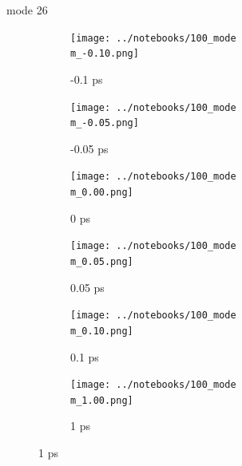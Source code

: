 \documentclass{beamer}
\newcommand\w{0.32}
\begin{document}
\renewcommand\m{26}
\begin{frame}{mode \m}
	\begin{figure}
		\centering
		\begin{subfigure}[b]{\w\textwidth}
			\centering
			\texttt{[image: ../notebooks/100\_mode\\m\_-0.10.png]}
			\caption{-0.1 ps}
		\end{subfigure}
		\begin{subfigure}[b]{\w\textwidth}
			\centering
			\texttt{[image: ../notebooks/100\_mode\\m\_-0.05.png]}
			\caption{-0.05 ps}
		\end{subfigure}
		\begin{subfigure}[b]{\w\textwidth}
			\centering
			\texttt{[image: ../notebooks/100\_mode\\m\_0.00.png]}
			\caption{0 ps}
		\end{subfigure}
		\begin{subfigure}[b]{\w\textwidth}
			\centering
			\texttt{[image: ../notebooks/100\_mode\\m\_0.05.png]}
			\caption{0.05 ps}
		\end{subfigure}
		\begin{subfigure}[b]{\w\textwidth}
			\centering
			\texttt{[image: ../notebooks/100\_mode\\m\_0.10.png]}
			\caption{0.1 ps}
		\end{subfigure}
		\begin{subfigure}[b]{\w\textwidth}
			\centering
			\texttt{[image: ../notebooks/100\_mode\\m\_1.00.png]}
			\caption{1 ps}
		\end{subfigure}
	\end{figure}
\end{frame}
\end{document}
